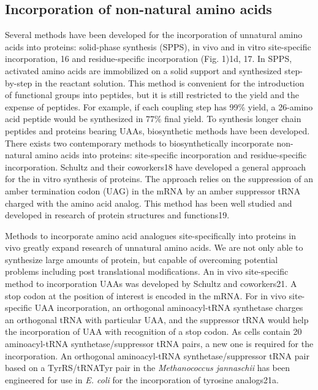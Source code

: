 \begin{refsection}
\subsection{Incorporation of non-natural amino acids}
\label{sec:rsi}

Several methods have been developed for the incorporation of unnatural amino
acids into proteins: solid-phase synthesis (SPPS)\cite{Mahto2011}, in vivo and
in vitro site-specific incorporation, 16 and residue-specific incorporation
(Fig. 1)1d, 17. In SPPS, activated amino acids are immobilized on a solid
support and synthesized step-by-step in the reactant solution. This method is
convenient for the introduction of functional groups into peptides, but it is
still restricted to the yield and the expense of peptides. For example, if each
coupling step has 99\% yield, a 26-amino acid peptide would be synthesized in
77\% final yield. To synthesis longer chain peptides and proteins bearing UAAs,
biosynthetic methods have been developed.  There exists two contemporary
methods to biosynthetically incorporate non-natural amino acids into proteins:
site-specific incorporation and residue-specific incorporation. Schultz and
their coworkers18 have developed a general approach for the in vitro synthesis
of proteins. The approach relies on the suppression of an amber termination
codon (UAG) in the mRNA by an amber suppressor tRNA charged with the amino acid
analog. This method has been well studied and developed in research of protein
structures and functions19. 


Methods to incorporate amino acid analogues site-specifically into proteins in
vivo greatly expand research of unnatural amino acids. We are not only able to
synthesize large amounts of protein, but capable of overcoming potential
problems including post translational modifications. An in vivo site-specific
method to incorporation UAAs was developed by Schultz and coworkers21. A stop
codon at the position of interest is encoded in the mRNA. For in vivo
site-specific UAA incorporation, an orthogonal aminoacyl-tRNA synthetase
charges an orthogonal tRNA with particular UAA, and the suppressor tRNA would
help the incorporation of UAA with recognition of a stop codon. As cells
contain 20 aminoacyl-tRNA synthetase/suppressor tRNA pairs, a new one is
required for the incorporation. An orthogonal aminoacyl-tRNA
synthetase/suppressor tRNA pair based on a TyrRS/tRNATyr pair in the
\emph{Methanococcus jannaschii} has been engineered for use in \emph{E. coli}
for the incorporation of tyrosine analogs21a.


\end{refsection}
